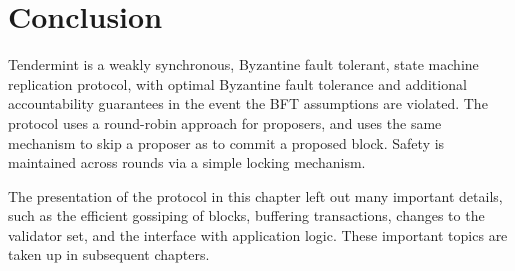\section{Conclusion}

Tendermint is a weakly synchronous, Byzantine fault tolerant, state machine replication protocol,
with optimal Byzantine fault tolerance and additional accountability guarantees in the event
the BFT assumptions are violated. 
The protocol uses a round-robin approach for proposers, and uses the same mechanism to skip a proposer as to commit a proposed block.
Safety is maintained across rounds via a simple locking mechanism.

The presentation of the protocol in this chapter left out many important details, 
such as the efficient gossiping of blocks, buffering transactions, changes to the validator set, 
and the interface with application logic. These important topics are taken up in subsequent chapters.


